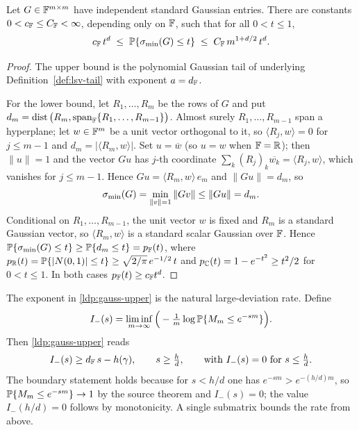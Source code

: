 \begin{lemma}\label{ldp:one-matrix}
Let \(G\in\mathbb{F}^{m\times m}\) have independent standard Gaussian entries.  There are
constants \(0<c_{\mathbb{F}}\le C_{\mathbb{F}}<\infty\), depending only on \(\mathbb{F}\), such that for all
\(0<t\le1\),
\begin{equation}\label{ldp:two-sided}
  c_{\mathbb{F}}\,t^{d}
  \;\le\;
  \mathbb{P}\{\sigma_{\min}(G)\le t\}
  \;\le\;
  C_{\mathbb{F}}\, m^{1+d/2}\,t^{d}.
\end{equation}
\end{lemma}

\begin{proof}
The upper bound is the polynomial Gaussian tail of \cite{ShmaloExtremal2026}
underlying Definition~\ref{def:lsv-tail} with exponent \(a=d_{\mathbb{F}}\).

For the lower bound, let \(R_1,\dots,R_m\) be the rows of \(G\) and put
\(d_m=\operatorname{dist}\big(R_m,\operatorname{span}_{\mathbb{F}}\{R_1,\dots,R_{m-1}\}\big)\).  Almost surely
\(R_1,\dots,R_{m-1}\) span a hyperplane; let \(w\in\mathbb{F}^m\) be a unit vector
orthogonal to it, so \(\langle R_j,w\rangle=0\) for \(j\le m-1\) and
\(d_m=|\langle R_m,w\rangle|\).  Set \(u=\overline w\) (so \(u=w\) when
\(\mathbb{F}=\mathbb{R}\)); then \(\|u\|=1\) and the vector \(Gu\) has \(j\)-th coordinate
\(\sum_k(R_j)_k\overline{w_k}=\langle R_j,w\rangle\), which vanishes for
\(j\le m-1\).  Hence \(Gu=\langle R_m,w\rangle\,e_m\) and \(\|Gu\|=d_m\), so
\[
  \sigma_{\min}(G)=\min_{\|v\|=1}\|Gv\|\le \|Gu\|=d_m.
\]
Conditional on \(R_1,\dots,R_{m-1}\), the unit vector \(w\) is fixed and \(R_m\)
is a standard Gaussian vector, so \(\langle R_m,w\rangle\) is a standard scalar
Gaussian over \(\mathbb{F}\).  Hence \(\mathbb{P}\{\sigma_{\min}(G)\le t\}\ge\mathbb{P}\{d_m\le t\}=p_{\mathbb{F}}(t)\),
where \(p_{\mathbb{R}}(t)=\mathbb{P}\{|N(0,1)|\le t\}\ge \sqrt{2/\pi}\,e^{-1/2}\,t\) and
\(p_{\mathbb{C}}(t)=1-e^{-t^2}\ge t^2/2\) for \(0<t\le1\).  In both cases
\(p_{\mathbb{F}}(t)\ge c_{\mathbb{F}} t^{d}\).
\end{proof}

The exponent in \eqref{ldp:gauss-upper} is the natural large-deviation rate.
Define
\begin{equation}\label{ldp:Iminus}
  I_-(s)=\liminf_{m\to\infty}\Big(-\tfrac1m\log\mathbb{P}\{M_m\le e^{-sm}\}\Big).
\end{equation}
Then \eqref{ldp:gauss-upper} reads
\begin{equation}\label{ldp:rate-lower}
  I_-(s)\ge d_{\mathbb{F}}\,s-h(\gamma),\qquad s\ge \tfrac{h}{d},
  \qquad\text{with } I_-(s)=0 \text{ for } s\le \tfrac{h}{d}.
\end{equation}
The boundary statement holds because for \(s<h/d\) one has
\(e^{-sm}>e^{-(h/d)m}\), so \(\mathbb{P}\{M_m\le e^{-sm}\}\to1\) by the source theorem
and \(I_-(s)=0\); the value \(I_-(h/d)=0\) follows by monotonicity.  A single
submatrix bounds the rate from above.

